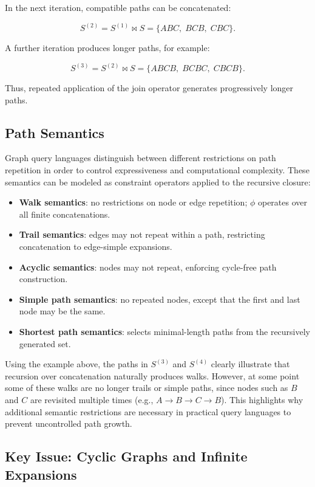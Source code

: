 In the next iteration, compatible paths can be concatenated:

\[
S^{(2)}
=
S^{(1)} \bowtie S
=
\{ ABC,\; BCB,\; CBC \}.
\]

A further iteration produces longer paths, for example:

\[
S^{(3)}
=
S^{(2)} \bowtie S
=
\{ ABCB,\; BCBC,\; CBCB \}.
\]

Thus, repeated application of the join operator generates progressively longer paths.

\subsection{Path Semantics}

Graph query languages distinguish between different restrictions on path repetition in order to control expressiveness and computational complexity. These semantics can be modeled as constraint operators applied to the recursive closure:

\begin{itemize}
    \item \textbf{Walk semantics}: no restrictions on node or edge repetition; $\phi$ operates over all finite concatenations.
    \item \textbf{Trail semantics}: edges may not repeat within a path, restricting concatenation to edge-simple expansions.
    \item \textbf{Acyclic semantics}: nodes may not repeat, enforcing cycle-free path construction.
    \item \textbf{Simple path semantics}: no repeated nodes, except that the first and last node may be the same.
    \item \textbf{Shortest path semantics}: selects minimal-length paths from the recursively generated set.
\end{itemize}

Using the example above, the paths in $S^{(3)}$ and $S^{(4)}$ clearly illustrate that recursion over concatenation naturally produces walks. However, at some point some of these walks are no longer trails or simple paths, since nodes such as $B$ and $C$ are revisited multiple times (e.g., $A \rightarrow B \rightarrow C \rightarrow B$). This highlights why additional semantic restrictions are necessary in practical query languages to prevent uncontrolled path growth.


\subsection{Key Issue: Cyclic Graphs and Infinite Expansions}

